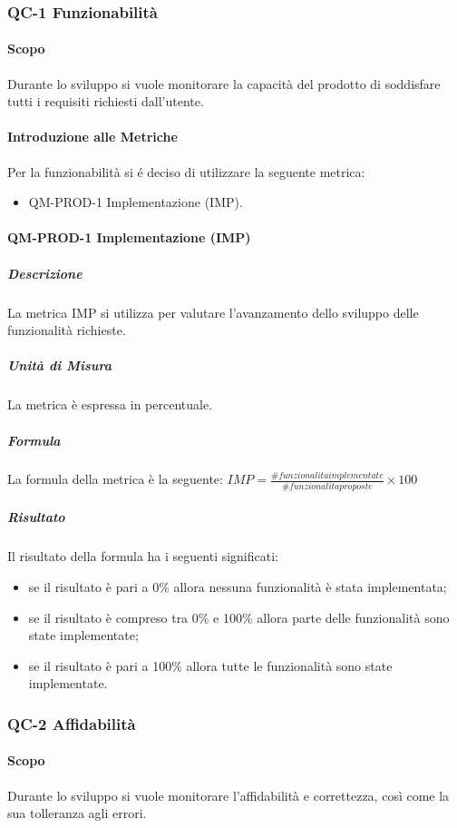 	\subsubsection{QC-1 Funzionabilità}
		\paragraph{Scopo}
			Durante lo sviluppo si vuole monitorare la capacità del prodotto di soddisfare tutti i requisiti richiesti dall'utente.
		\paragraph{Introduzione alle Metriche}
			Per la funzionabilità si é deciso di utilizzare la seguente metrica:
			\begin{itemize}
				\item QM-PROD-1 Implementazione (IMP).
			\end{itemize}
		\paragraph{QM-PROD-1 Implementazione (IMP)}
			\subparagraph{Descrizione}
				La metrica IMP si utilizza per valutare l'avanzamento dello sviluppo delle funzionalità richieste.
			\subparagraph{Unità di Misura}
				La metrica è espressa in percentuale.
			\subparagraph{Formula}
				La formula della metrica è la seguente:
				\(
					IMP = \frac{\# funzionalita implementate}{\# funzionalita proposte}\times100
				\)
			\subparagraph{Risultato}
				Il risultato della formula ha i seguenti significati:
				\begin{itemize}
					\item se il risultato è pari a 0\% allora nessuna funzionalità è stata implementata;
					\item se il risultato è compreso tra 0\% e 100\% allora parte delle funzionalità sono state implementate;
					\item se il risultato è pari a 100\% allora tutte le funzionalità sono state implementate.
				\end{itemize}

	\subsubsection{QC-2 Affidabilità}
		\paragraph{Scopo}
		Durante lo sviluppo si vuole monitorare l'affidabilità e correttezza, così come la sua tolleranza agli errori.
